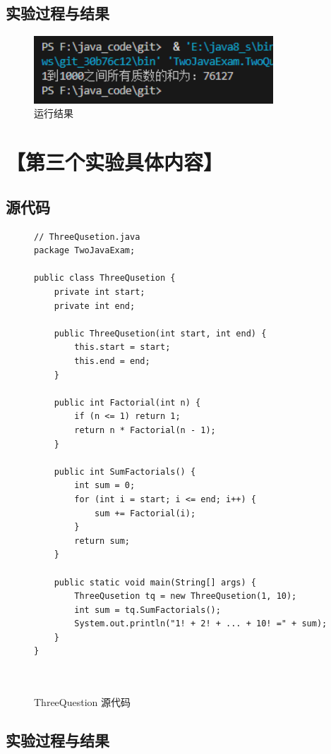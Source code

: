 \documentclass[12pt,a4paper]{article}
\begin{document}
\subsection*{实验过程与结果}

\begin{figure}[H]
\centering
\includegraphics[width=0.8\textwidth]{two.png}
\caption{运行结果}
\end{figure}

\section*{【第三个实验具体内容】}

\subsection*{源代码}
\begin{figure}[H]
\centering
\begin{lstlisting}
// ThreeQusetion.java
package TwoJavaExam;

public class ThreeQusetion {
	private int start;
	private int end;

	public ThreeQusetion(int start, int end) {
		this.start = start;
		this.end = end;
	}

	public int Factorial(int n) {
		if (n <= 1) return 1;
		return n * Factorial(n - 1);
	}

	public int SumFactorials() {
		int sum = 0;
		for (int i = start; i <= end; i++) {
			sum += Factorial(i);
		}
		return sum;
	}

	public static void main(String[] args) {
		ThreeQusetion tq = new ThreeQusetion(1, 10);
		int sum = tq.SumFactorials();
		System.out.println("1! + 2! + ... + 10! =" + sum);
	}
}



\end{lstlisting}
\caption{ThreeQuestion 源代码}
\end{figure}

\subsection*{实验过程与结果}
\end{document}
